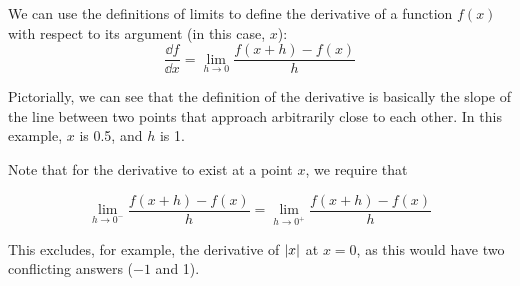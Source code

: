 \begin{wrapfigure}{l}{0.5\textwidth}
\end{wrapfigure}

\begin{definition}[Derivative]
	We can use the definitions of limits to define the derivative of a function \(f(x)\) with respect to its argument (in this case, \(x\)):
	\begin{equation}\label{derivative}
		\frac{\dd{f}}{\dd{x}} = \lim_{h \to 0} \frac{f(x+h)-f(x)}{h}
	\end{equation}
\end{definition}

Pictorially, we can see that the definition of the derivative is basically the slope of the line between two points that approach arbitrarily close to each other.
In this example, \(x\) is 0.5, and \(h\) is 1.

Note that for the derivative to exist at a point \(x\), we require that

\[
	\lim_{h \to 0^-} \frac{f(x+h)-f(x)}{h} = \lim_{h \to 0^+} \frac{f(x+h)-f(x)}{h}
\]

This excludes, for example, the derivative of \(\abs{x}\) at \(x=0\), as this would have two conflicting answers (\(-1\) and 1).

